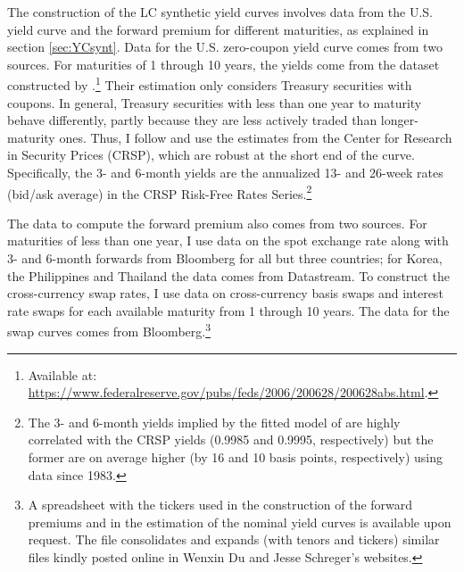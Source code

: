 {The construction of the LC synthetic yield curves involves data from the U.S. yield curve and the forward premium for different maturities, as explained in section \ref{sec:YCsynt}. 
Data for the U.S. zero-coupon yield curve comes from two sources. 
For maturities of 1 through 10 years, the yields come from the dataset constructed by \cite{GSW:2007}.\footnote{Available at: \url{https://www.federalreserve.gov/pubs/feds/2006/200628/200628abs.html}.} 
Their estimation only considers Treasury securities with coupons.
In general, Treasury securities with less than one year to maturity behave differently, partly because  
they are less actively traded than longer-maturity ones. 
Thus, I follow \cite{Duffee:2010} and use the estimates from the Center for Research in Security Prices (CRSP), which are %
robust at the short end of the curve.
Specifically, the 3- and 6-month yields are the annualized 13- and 26-week rates (bid/ask average) in the CRSP Risk-Free Rates Series.\footnote{ The 3- and 6-month yields implied by the fitted model of \cite{GSW:2007} are highly correlated with the CRSP yields (0.9985 and 0.9995, respectively) but the former are on average higher (by 16 and 10 basis points, respectively) using data since 1983.} 

The data to compute the forward premium also comes from two sources.
For maturities of less than one year, I use data on the spot exchange rate along with 3- and 6-month forwards from Bloomberg for all but three countries; for Korea, the Philippines and Thailand the data comes from Datastream.
To construct the cross-currency swap rates, I use data on cross-currency basis swaps and interest rate swaps for each available maturity from 1 through 10 years. 
The data for the swap curves comes from Bloomberg.\footnote{A spreadsheet with the tickers used in the construction of the forward premiums and in the estimation of the nominal yield curves is available upon request. The file consolidates and expands (with tenors and tickers) similar files kindly posted online in Wenxin Du and Jesse Schreger's websites.}

}
